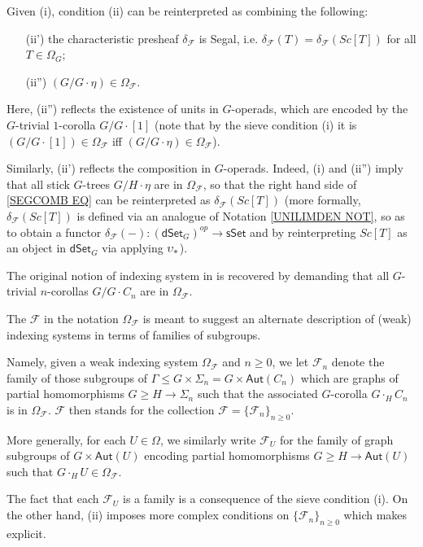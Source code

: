 \documentclass[a4paper,10pt
 ,draft
]{article}%
\begin{document}
\begin{remark}\label{SEGCOMB REM}
Given (i), condition (ii) can be reinterpreted as combining the following: %
\begin{itemize}
	\item[(ii')] the characteristic presheaf $\delta_{\mathcal{F}}$ is Segal, i.e. 
	$\delta_{\mathcal{F}}(T) = 
	\delta_{\mathcal{F}}(Sc[T])$
	for all $T \in \Omega_G$;
	\item[(ii'')] $(G/G \cdot \eta) \in \Omega_{\mathcal{F}}$.
\end{itemize}

Here, (ii'') reflects the existence of units in $G$-operads,
which are encoded by the
$G$-trivial $1$-corolla $G/G\cdot [1]$
(note that by the sieve condition (i) it is
$(G/G\cdot [1]) \in \Omega_{\mathcal{F}}$
iff 
$(G/G\cdot \eta) \in \Omega_{\mathcal{F}}$).

Similarly, (ii') reflects the composition in $G$-operads.
Indeed, (i) and (ii'') imply that
all stick $G$-trees $G/H \cdot \eta$ are in 
$\Omega_{\mathcal{F}}$,
so that the right hand side of \eqref{SEGCOMB EQ}
can be reinterpreted as $\delta_{\mathcal{F}}(Sc[T])$
(more formally, $\delta_{\mathcal{F}}(Sc[T])$ is defined via an analogue of 
Notation \ref{UNILIMDEN NOT}, 
so as to obtain a functor
$\delta_{\mathcal{F}}(-) \colon 
(\mathsf{dSet}_G)^{op} \to \mathsf{sSet}$ 
and by reinterpreting $Sc[T]$ as an object in 
$\mathsf{dSet}_G$ via applying $\upsilon_{\**}$).
\end{remark}

\begin{remark}
The original notion of indexing system 
in \cite[Def. 3.22]{BH15} is recovered by demanding that all
$G$-trivial $n$-corollas $G/G \cdot C_n$ are in 
$\Omega_{\mathcal{F}}$.
\end{remark}


\begin{remark}\label{WHYF REM}
	The $\mathcal{F}$ in the notation $\Omega_{\mathcal{F}}$
is meant to suggest an alternate description of (weak) indexing systems in terms of families of subgroups.

Namely, given a weak indexing system $\Omega_{\mathcal{F}}$ and $n \geq 0$, we let $\mathcal{F}_n$
denote the family of those subgroups 
of $\Gamma \leq G \times \Sigma_n = G \times \mathsf{Aut}(C_n)$ which are graphs of partial homomorphisms
	$G \geq H \to \Sigma_n$
	such that the associated $G$-corolla $G\cdot_H C_n$ is in $\Omega_{\mathcal{F}}$.
	$\mathcal{F}$ then stands for the collection
	$\mathcal{F} = \{\mathcal{F}_{n}\}_{n \geq 0}$.

More generally, for each $U \in \Omega$, we similarly write
$\mathcal{F}_U$
for the family of graph subgroups of $G \times \mathsf{Aut}(U)$ encoding partial homomorphisms 
$G \geq H \to \mathsf{Aut}(U)$ such that
$G \cdot_H U \in \Omega_{\mathcal{F}}$.


The fact that each $\mathcal{F}_U$ is a family is a consequence of the sieve condition (i).
On the other hand, (ii) imposes more complex conditions on $\{\mathcal{F}_{n}\}_{n \geq 0}$
which \cite[Def. 3.22]{BH15} makes explicit.
\end{remark}
\end{document}
